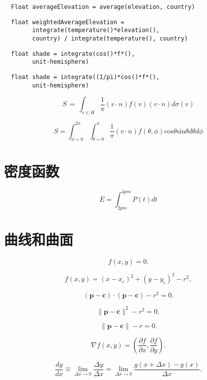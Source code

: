 \documentclass[lang=cn,12pt,marginpar=margintrue]{elegantbook}
\begin{document}
\begin{lstlisting}
  Float averageElevation = average(elevation, country)
\end{lstlisting}

\begin{lstlisting}
  float weightedAverageElevation =
        integrate(temperature()*elevation(),
        country) / integrate(temperature(), country)
\end{lstlisting}

\begin{lstlisting}
  float shade = integrate(cos()*f*(),
        unit-hemisphere)
\end{lstlisting}

\begin{lstlisting}
  float shade = integrate((1/pi)*cos()*f*(),
        unit-hemisphere)
\end{lstlisting}

\[
  S\,=\,\int_{v\in H}\frac{1}{\pi}(v\cdot n)f(v)(v\cdot n)d\sigma(v)
\]

\[
  S=\int_{\phi=0}^{2\pi}\int_{\theta=0}^{\pi}\frac{1}{\pi}(v\cdot n)f(\theta,\phi)\mathrm{cos}\theta\mathrm{sin}\theta d\theta d\phi
\]

\section{密度函数}

\[
  E=\int_{2p m}^{4p m}P(t) dt
\]

\section{曲线和曲面}

\[
  f(x,y)=0.
\]

\begin{equation}
  f(x,y)=(x-x_{c})^{2}+(y-y_{c})^{2}-r^{2},
\end{equation}

\[
  (\mathbf{p}-\mathbf{c})\cdot(\mathbf{p}-\mathbf{c})-r^{2}=0.
\]

\[
  \|\mathbf{p}-\mathbf{c}\|^{2}-r^{2}=0,
\]

\[
  \|\mathbf{p}-\mathbf{c}\|-r=0.
\]

\[
  \nabla f(x,y)=\left({\frac{\partial f}{\partial x}},{\frac{\partial f}{\partial y}}\right).
\]

\begin{equation}
  {\frac{d y}{d x}}\equiv\operatorname*{lim}_{\Delta x\to0}{\frac{\Delta y}{\Delta x}}=\operatorname*{lim}_{\Delta x\to0}{\frac{g(x+\Delta x)-g(x)}{\Delta x}}.
\end{equation}
\end{document}
